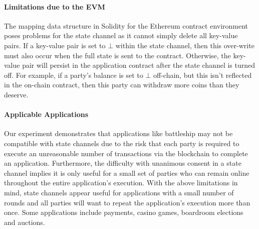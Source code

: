 \documentclass{llncs}
\begin{document}
	\paragraph{Limitations due to the EVM} 
	The mapping data structure in Solidity for the Ethereum contract environment poses problems for the state channel as it cannot simply delete all key-value pairs.
	If a key-value pair is set to $\bot$ within the state channel, then this over-write must also occur when the full state is sent to the contract. 
	Otherwise, the key-value pair will persist in the application contract after the state channel is turned off.
	For example, if a party's balance is set to $\bot$ off-chain, but this isn't reflected in the on-chain contract, then this party can withdraw more coins than they deserve. 
	
	\paragraph{Applicable Applications} 
	Our experiment demonstrates that applications like battleship may not be compatible with state channels due to the risk that each party is required to execute an unreasonable number of transactions via the blockchain to complete an application. 
	Furthermore, the difficulty with unanimous consent in a state channel implies it is only useful for a small set of parties who can remain online throughout the entire application's execution. 
	With the above limitations in mind, state channels appear useful for applications with a small number of rounds and all parties will want to repeat the application's execution more than once. 
	Some applications include payments, casino games, boardroom elections and auctions.
	
\end{document}
